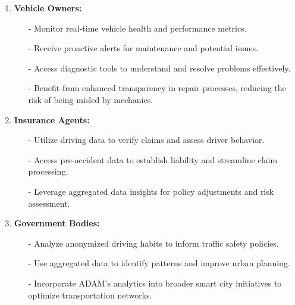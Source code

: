 \begin{enumerate}
    \item \textbf{Vehicle Owners:}
    \begin{itemize}
        \item[-] Monitor real-time vehicle health and performance metrics.
        \item[-] Receive proactive alerts for maintenance and potential issues.
        \item[-] Access diagnostic tools to understand and resolve problems effectively.
        \item[-] Benefit from enhanced transparency in repair processes, reducing the risk of being misled by mechanics.
    \end{itemize}
    
    \item \textbf{ Insurance Agents:}
    \begin{itemize}
        \item[-] Utilize driving data to verify claims and assess driver behavior.
        \item[-] Access pre-accident data to establish liability and streamline claim processing.
        \item[-] Leverage aggregated data insights for policy adjustments and risk assessment.
    \end{itemize}

    \item \textbf{Government Bodies:}
    \begin{itemize}
        \item[-] Analyze anonymized driving habits to inform traffic safety policies.
        \item[-] Use aggregated data to identify patterns and improve urban planning.
        \item[-] Incorporate ADAM’s analytics into broader smart city initiatives to optimize transportation networks.
    \end{itemize}
\end{enumerate}
\newpage
